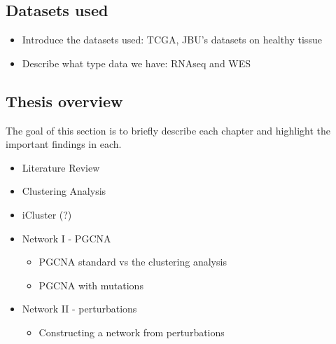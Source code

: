 \subsection{Datasets used} 

\begin{itemize}
    \item Introduce the datasets used: TCGA, JBU's datasets on healthy tissue
    \item Describe what type data we have: RNAseq and WES
\end{itemize}


\subsection{Thesis overview } 


The goal of this section is to briefly describe each chapter and highlight the important findings in each.

\begin{itemize}
    \item Literature Review
    \item Clustering Analysis
    \item iCluster (?)
    \item Network I - PGCNA
    \begin{itemize}
        \item PGCNA standard vs the clustering analysis
        \item PGCNA with mutations
    \end{itemize}
    \item Network II - perturbations
    \begin{itemize}
        \item Constructing a network from perturbations
    \end{itemize}
\end{itemize}